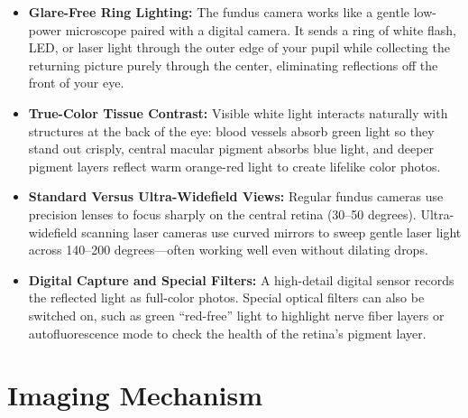 \begin{itemize}
    \item \textbf{Glare-Free Ring Lighting:} The fundus camera works like a gentle low-power microscope paired with a digital camera. It sends a ring of white flash, LED, or laser light through the outer edge of your pupil while collecting the returning picture purely through the center, eliminating reflections off the front of your eye.
    \item \textbf{True-Color Tissue Contrast:} Visible white light interacts naturally with structures at the back of the eye: blood vessels absorb green light so they stand out crisply, central macular pigment absorbs blue light, and deeper pigment layers reflect warm orange-red light to create lifelike color photos.
    \item \textbf{Standard Versus Ultra-Widefield Views:} Regular fundus cameras use precision lenses to focus sharply on the central retina (30--50 degrees). Ultra-widefield scanning laser cameras use curved mirrors to sweep gentle laser light across 140--200 degrees---often working well even without dilating drops.
    \item \textbf{Digital Capture and Special Filters:} A high-detail digital sensor records the reflected light as full-color photos. Special optical filters can also be switched on, such as green ``red-free'' light to highlight nerve fiber layers or autofluorescence mode to check the health of the retina's pigment layer.
\end{itemize}

\section{Imaging Mechanism}

